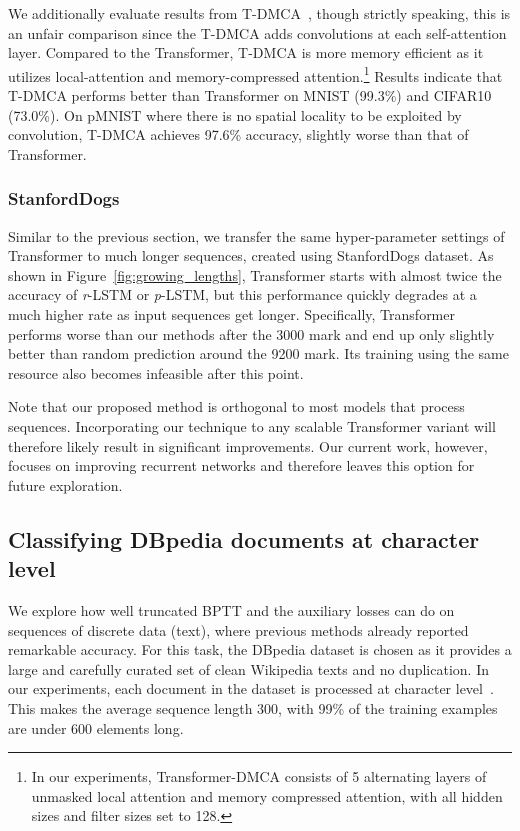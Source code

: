 \documentclass{article}
\newcommand{\rlstm}{{\it r}-LSTM}
\newcommand{\plstm}{{\it p}-LSTM}
\begin{document}
We additionally evaluate results from T-DMCA~\cite{liu18}, though strictly speaking, this is an unfair comparison since the T-DMCA adds convolutions at each self-attention layer. Compared to the Transformer, T-DMCA is more memory efficient as it utilizes local-attention and memory-compressed attention.\footnote{In our experiments, Transformer-DMCA consists of 5 alternating layers of unmasked local attention and memory compressed attention, with all hidden sizes and filter sizes set to 128.} Results indicate that T-DMCA performs better than Transformer on MNIST (99.3\%) and CIFAR10 (73.0\%). On pMNIST where there is no spatial locality to be exploited by convolution, T-DMCA achieves 97.6\% accuracy, slightly worse than that of Transformer.


\subsubsection{StanfordDogs}

Similar to the previous section, we transfer the same hyper-parameter settings of Transformer to much longer sequences, created using StanfordDogs dataset. As shown in Figure~\ref{fig:growing_lengths}, Transformer starts with almost twice the accuracy of \rlstm{} or \plstm{}, but this performance quickly degrades at a much higher rate as input sequences get longer. Specifically, Transformer performs worse than our methods after the 3000 mark and end up only slightly better than random prediction around the 9200 mark. Its training using the same resource also becomes infeasible after this point.

Note that our proposed method is orthogonal to most models that process sequences. Incorporating our technique to any scalable Transformer variant will therefore likely result in significant improvements. Our current work, however, focuses on improving recurrent networks and therefore leaves this option for future exploration.

\subsection{Classifying DBpedia documents at character level}

We explore how well truncated BPTT and the auxiliary losses can do on sequences of discrete data (text), where previous methods already reported remarkable accuracy. For this task, the DBpedia dataset is chosen as it provides a large and carefully curated set of clean Wikipedia texts and no duplication. In our experiments, each document in the dataset is processed at character level~\cite{zhang2015text}. This makes the average sequence length 300, with 99\% of the training examples are under 600 elements long.
\end{document}
